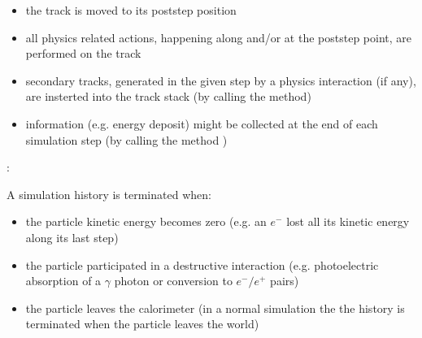 \documentclass[letterpaper,10pt,english]{sphinxmanual}
\begin{document}
\begin{fulllineitems}
\begin{itemize}
\item {} 
\sphinxAtStartPar
the track is moved to its post\sphinxhyphen{}step position

\item {} 
\sphinxAtStartPar
all physics related actions, happening along and/or at the post\sphinxhyphen{}step point, are performed on the track

\item {} 
\sphinxAtStartPar
secondary tracks, generated in the given step by a physics interaction (if any), are insterted into the track stack (by calling the  method)

\item {} 
\sphinxAtStartPar
information (e.g. energy deposit) might be collected at the end of each simulation step (by calling the  method )

\end{itemize}


\sphinxAtStartPar
{}:

\sphinxAtStartPar
A simulation history is terminated when:\begin{itemize}
\item {} 
\sphinxAtStartPar
the particle kinetic energy becomes zero (e.g. an \(e^-\) lost all its kinetic energy along its last step)

\item {} 
\sphinxAtStartPar
the particle participated in a destructive interaction (e.g. photoelectric absorption of a \(\gamma\) photon or conversion to \(e^-/e^+\) pairs)

\item {} 
\sphinxAtStartPar
the particle leaves the calorimeter (in a normal  simulation the the history is terminated when the particle leaves the world)


\end{itemize}
\end{fulllineitems}
\end{document}
